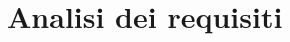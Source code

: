 \documentclass[a4paper,11pt]{report}
\begin{document}
    \tableofcontents

    
    \chapter{Analisi dei requisiti}
    
\end{document}
